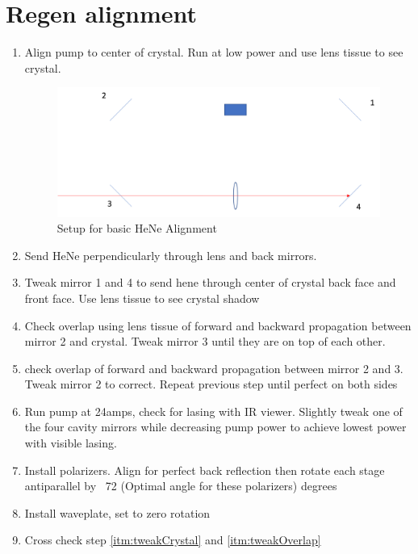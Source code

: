 \documentclass{article}
\begin{document}
\section{Regen alignment}
\begin{enumerate}
    \item Align pump to center of crystal. Run at low power and use lens tissue to see crystal.
          \begin{figure}[!ht]
              \centering
              \includegraphics[width=1.0\textwidth]{Regen Alignment/HeNe Alignment}
              \caption{Setup for basic HeNe Alignment}
              \label{fig:HeNe_alignment}
          \end{figure}
    \item Send HeNe perpendicularly through lens and back mirrors.
    \item \label{itm:tweakCrystal} Tweak mirror 1 and 4 to send hene through center of crystal back face and front face. Use lens tissue to see crystal shadow
    \item \label{itm:tweakOverlap} Check overlap using lens tissue of forward and backward propagation between mirror 2 and crystal. Tweak mirror 3 until they are on top of each other.
    \item check overlap of forward and backward propagation between mirror 2 and 3. Tweak mirror 2 to correct. Repeat previous step until perfect on both sides
    \item \label{itm:optimizeAmps} Run pump at 24amps, check for lasing with IR viewer. Slightly tweak one of the four cavity mirrors while decreasing pump power to achieve lowest power with visible lasing.
    \item Install polarizers. Align for perfect back reflection then rotate each stage antiparallel by ~72 (Optimal angle for these polarizers) degrees
    \item Install waveplate, set to zero rotation
    \item Cross check step \ref{itm:tweakCrystal} and \ref{itm:tweakOverlap}

\end{enumerate}
\end{document}
